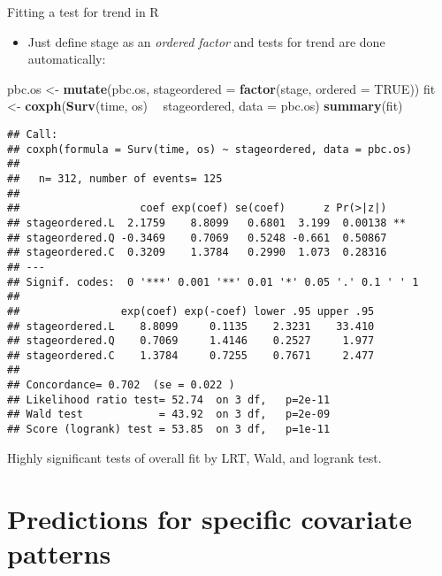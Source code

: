\documentclass[
  ignorenonframetext,
]{beamer}
\newenvironment{Shaded}{\begin{snugshade}}{\end{snugshade}}
\newcommand{\DataTypeTok}[1]{\textcolor[rgb]{0.13,0.29,0.53}{#1}}
\newcommand{\KeywordTok}[1]{\textcolor[rgb]{0.13,0.29,0.53}{\textbf{#1}}}
\newcommand{\NormalTok}[1]{#1}
\newcommand{\OperatorTok}[1]{\textcolor[rgb]{0.81,0.36,0.00}{\textbf{#1}}}
\newcommand{\OtherTok}[1]{\textcolor[rgb]{0.56,0.35,0.01}{#1}}
\newcommand{\StringTok}[1]{\textcolor[rgb]{0.31,0.60,0.02}{#1}}
\providecommand{\tightlist}{%
  \setlength{\itemsep}{0pt}\setlength{\parskip}{0pt}}
\begin{document}
\begin{frame}[fragile]{Fitting a test for trend in R}
\protect\hypertarget{fitting-a-test-for-trend-in-r}{}

\begin{itemize}
\tightlist
\item
  Just define stage as an \emph{ordered factor} and tests for trend are
  done automatically:
\end{itemize}

\tiny

\begin{Shaded}
\begin{Highlighting}[]
\NormalTok{pbc.os <-}
\StringTok{  }\KeywordTok{mutate}\NormalTok{(pbc.os, }\DataTypeTok{stageordered =} \KeywordTok{factor}\NormalTok{(stage, }\DataTypeTok{ordered =} \OtherTok{TRUE}\NormalTok{))}
\NormalTok{fit <-}\StringTok{ }\KeywordTok{coxph}\NormalTok{(}\KeywordTok{Surv}\NormalTok{(time, os) }\OperatorTok{~}\StringTok{ }\NormalTok{stageordered, }\DataTypeTok{data =}\NormalTok{ pbc.os)}
\KeywordTok{summary}\NormalTok{(fit)  }
\end{Highlighting}
\end{Shaded}

\begin{verbatim}
## Call:
## coxph(formula = Surv(time, os) ~ stageordered, data = pbc.os)
## 
##   n= 312, number of events= 125 
## 
##                   coef exp(coef) se(coef)      z Pr(>|z|)   
## stageordered.L  2.1759    8.8099   0.6801  3.199  0.00138 **
## stageordered.Q -0.3469    0.7069   0.5248 -0.661  0.50867   
## stageordered.C  0.3209    1.3784   0.2990  1.073  0.28316   
## ---
## Signif. codes:  0 '***' 0.001 '**' 0.01 '*' 0.05 '.' 0.1 ' ' 1
## 
##                exp(coef) exp(-coef) lower .95 upper .95
## stageordered.L    8.8099     0.1135    2.3231    33.410
## stageordered.Q    0.7069     1.4146    0.2527     1.977
## stageordered.C    1.3784     0.7255    0.7671     2.477
## 
## Concordance= 0.702  (se = 0.022 )
## Likelihood ratio test= 52.74  on 3 df,   p=2e-11
## Wald test            = 43.92  on 3 df,   p=2e-09
## Score (logrank) test = 53.85  on 3 df,   p=1e-11
\end{verbatim}

Highly significant tests of overall fit by LRT, Wald, and logrank test.

\end{frame}

\hypertarget{predictions-for-specific-covariate-patterns}{%
\section{Predictions for specific covariate
patterns}\label{predictions-for-specific-covariate-patterns}}
\end{document}

